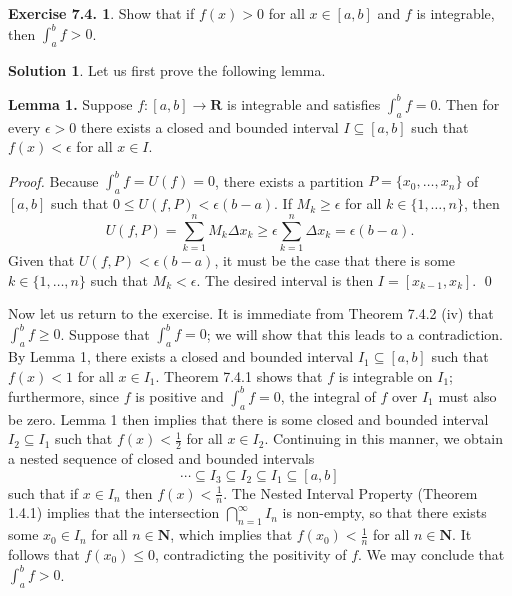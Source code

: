 \documentclass[12pt]{article}
\theoremstyle{definition}
\theoremstyle{exercise}
\newtheorem{exercise}{Exercise 7.4.}
\theoremstyle{solution}
\newtheorem*{solution}{Solution}
\newcommand{\N}{\mathbf{N}}
\newcommand{\R}{\mathbf{R}}
\begin{document}
\begin{exercise}
\label{ex:4}
    Show that if \( f(x) > 0 \) for all \( x \in [a, b] \) and \( f \) is integrable, then \( \int_a^b f > 0 \).
\end{exercise}

\begin{solution}
    Let us first prove the following lemma.

    \vspace{2mm}

    \noindent \textbf{Lemma 1.} Suppose \( f : [a, b] \to \R \) is integrable and satisfies \( \int_a^b f = 0 \). Then for every \( \epsilon > 0 \) there exists a closed and bounded interval \( I \subseteq [a, b] \) such that \( f(x) < \epsilon \) for all \( x \in I \).

    \vspace{2mm}
    
    \noindent \textit{Proof.} Because \( \int_a^b f = U(f) = 0 \), there exists a partition \( P = \{ x_0, \ldots, x_n \} \) of \( [a, b] \) such that \( 0 \leq U(f, P) < \epsilon (b - a) \). If \( M_k \geq \epsilon \) for all \( k \in \{ 1, \ldots, n \} \), then
    \[
        U(f, P) = \sum_{k=1}^n M_k \Delta x_k \geq \epsilon \sum_{k=1}^n \Delta x_k = \epsilon (b - a).
    \]
    Given that \( U(f, P) < \epsilon (b - a) \), it must be the case that there is some \( k \in \{ 1, \ldots, n \} \) such that \( M_k < \epsilon \). The desired interval is then \( I = [x_{k-1}, x_k] \). \qed

    \vspace{2mm}

    Now let us return to the exercise. It is immediate from Theorem 7.4.2 (iv) that \( \int_a^b f \geq 0 \). Suppose that \( \int_a^b f = 0 \); we will show that this leads to a contradiction. By Lemma 1, there exists a closed and bounded interval \( I_1 \subseteq [a, b] \) such that \( f(x) < 1 \) for all \( x \in I_1 \). Theorem 7.4.1 shows that \( f \) is integrable on \( I_1 \); furthermore, since \( f \) is positive and \( \int_a^b f = 0 \), the integral of \( f \) over \( I_1 \) must also be zero. Lemma 1 then implies that there is some closed and bounded interval \( I_2 \subseteq I_1 \) such that \( f(x) < \tfrac{1}{2} \) for all \( x \in I_2 \). Continuing in this manner, we obtain a nested sequence of closed and bounded intervals
    \[
        \cdots \subseteq I_3 \subseteq I_2 \subseteq I_1 \subseteq [a, b]
    \]
    such that if \( x \in I_n \) then \( f(x) < \tfrac{1}{n} \). The Nested Interval Property (Theorem 1.4.1) implies that the intersection \( \bigcap_{n=1}^{\infty} I_n \) is non-empty, so that there exists some \( x_0 \in I_n \) for all \( n \in \N \), which implies that \( f(x_0) < \tfrac{1}{n} \) for all \( n \in \N \). It follows that \( f(x_0) \leq 0 \), contradicting the positivity of \( f \). We may conclude that \( \int_a^b f > 0 \).
\end{solution}
\end{document}
